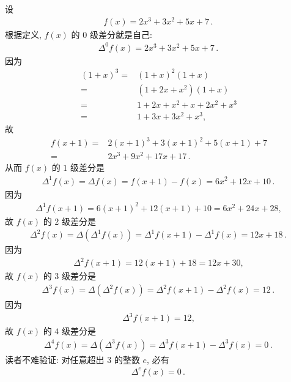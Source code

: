 \begin{example}
    设
    \begin{align*}
        f(x) = 2x^3 + 3x^2 + 5x + 7 \period
    \end{align*}
    根据定义, $f(x)$ 的 $0$ 级差分就是自己:
    \begin{align*}
        \Delta^0 f(x) = 2x^3 + 3x^2 + 5x + 7 \period
    \end{align*}
    因为
    \begin{align*}
        (1+x)^3
        = {} & (1+x)^2 (1+x)         \\
        = {} & (1+2x+x^2) (1+x)      \\
        = {} & 1+2x+x^2 + x+2x^2+x^3 \\
        = {} & 1+3x+3x^2+x^3,
    \end{align*}
    故
    \begin{align*}
        f(x+1)
        = {} & 2(x+1)^3 + 3(x+1)^2 + 5(x+1) + 7 \\
        = {} & 2x^3 + 9x^2 + 17x + 17 \period
    \end{align*}
    从而 $f(x)$ 的 $1$ 级差分是
    \begin{align*}
        \Delta^1 f(x) = \Delta f(x) = f(x+1) - f(x) = 6x^2 + 12x + 10 \period
    \end{align*}
    因为
    \begin{align*}
        \Delta^1 f(x+1) = 6(x+1)^2 + 12(x+1) + 10 = 6x^2 + 24x + 28,
    \end{align*}
    故 $f(x)$ 的 $2$ 级差分是
    \begin{align*}
        \Delta^2 f(x) = \Delta (\Delta^1 f(x)) = \Delta^1 f(x+1) - \Delta^1 f(x) = 12x + 18 \period
    \end{align*}
    因为
    \begin{align*}
        \Delta^2 f(x+1) = 12(x+1) + 18 = 12x + 30,
    \end{align*}
    故 $f(x)$ 的 $3$ 级差分是
    \begin{align*}
        \Delta^3 f(x) = \Delta (\Delta^2 f(x)) = \Delta^2 f(x+1) - \Delta^2 f(x) = 12 \period
    \end{align*}
    因为
    \begin{align*}
        \Delta^3 f(x+1) = 12,
    \end{align*}
    故 $f(x)$ 的 $4$ 级差分是
    \begin{align*}
        \Delta^4 f(x) = \Delta (\Delta^3 f(x)) = \Delta^3 f(x+1) - \Delta^3 f(x) = 0 \period
    \end{align*}
    读者不难验证: 对任意超出 $3$ 的整数 $e$, 必有
    \begin{align*}
        \Delta^e f(x) = 0 \period
    \end{align*}


\end{example}
